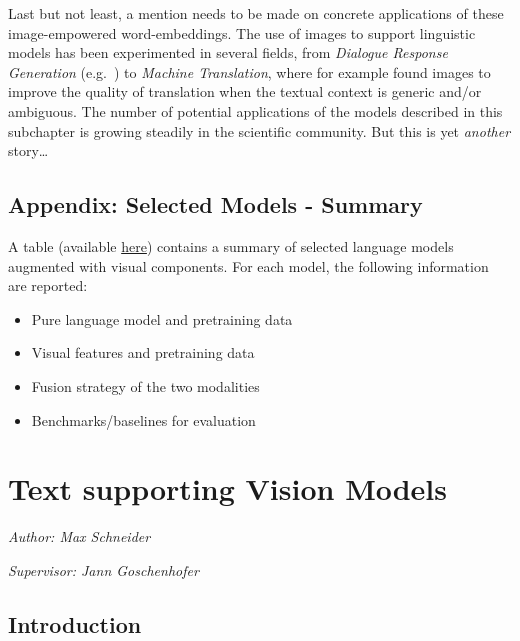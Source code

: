 \documentclass[
]{krantz}
\providecommand{\tightlist}{%
  \setlength{\itemsep}{0pt}\setlength{\parskip}{0pt}}
\begin{document}
Last but not least, a mention needs to be made on concrete applications of these image-empowered word-embeddings. The use of images to support linguistic models has been experimented in several fields, from \emph{Dialogue Response Generation} (e.g.~\citet{sun2021multimodal}) to \emph{Machine Translation}, where for example \citet{ive2019distilling} found images to improve the quality of translation when the textual context is generic and/or ambiguous. The number of potential applications of the models described in this subchapter is growing steadily in the scientific community. But this is yet \emph{another} story\ldots{}

\hypertarget{appendix-selected-models---summary}{%
\subsection{Appendix: Selected Models - Summary}\label{appendix-selected-models---summary}}

A table (available \href{https://github.com/slds-lmu/seminar_multimodal_dl/blob/master/Table-ch2-3-final.pdf}{here}) contains a summary of selected language models augmented with visual components. For each model, the following information are reported:

\begin{itemize}
\tightlist
\item
  Pure language model and pretraining data
\item
  Visual features and pretraining data
\item
  Fusion strategy of the two modalities
\item
  Benchmarks/baselines for evaluation
\end{itemize}

\hypertarget{c02-04-text-support-img}{%
\section{Text supporting Vision Models}\label{c02-04-text-support-img}}

\emph{Author: Max Schneider}

\emph{Supervisor: Jann Goschenhofer}

\hypertarget{introduction-2}{%
\subsection{Introduction}\label{introduction-2}}
\end{document}
